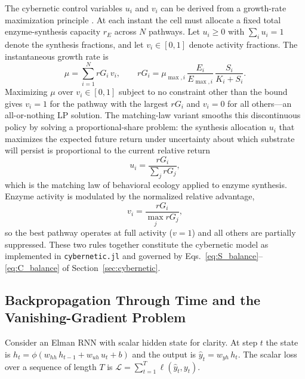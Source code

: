 The cybernetic control variables $u_i$ and $v_i$ can be derived from a
growth-rate maximization principle \cite{Kompala1984}.  At each instant the
cell must allocate a fixed total enzyme-synthesis capacity $r_E$ across $N$
pathways.  Let $u_i \geq 0$ with $\sum_i u_i = 1$ denote the synthesis
fractions, and let $v_i \in [0,1]$ denote activity fractions.  The
instantaneous growth rate is
\begin{equation}\label{eq:obj_cyber}
  \mu = \sum_{i=1}^{N} rG_i\,v_i,
  \qquad rG_i = \mu_{\max,i}\,\frac{E_i}{E_{\max,i}}\,\frac{S_i}{K_i + S_i}.
\end{equation}
Maximizing $\mu$ over $v_i \in [0,1]$ subject to no constraint other than
the bound gives $v_i = 1$ for the pathway with the largest $rG_i$ and
$v_i = 0$ for all others---an all-or-nothing LP solution.  The matching-law
variant smooths this discontinuous policy by solving a proportional-share
problem: the synthesis allocation $u_i$ that maximizes the expected future
return under uncertainty about which substrate will persist is
proportional to the current relative return
\begin{equation}
  u_i = \frac{rG_i}{\sum_j rG_j},
\end{equation}
which is the matching law of behavioral ecology applied to enzyme synthesis.
Enzyme activity is modulated by the normalized relative advantage,
\begin{equation}
  v_i = \frac{rG_i}{\max_j rG_j},
\end{equation}
so the best pathway operates at full activity ($v = 1$) and all others are
partially suppressed.  These two rules together constitute the cybernetic
model as implemented in \texttt{cybernetic.jl} and governed by
Eqs.~\eqref{eq:S_balance}--\eqref{eq:C_balance} of Section~\ref{sec:cybernetic}.

\subsection{Backpropagation Through Time and the Vanishing-Gradient Problem}
\label{sec:bptt_derivation}

Consider an Elman RNN with scalar hidden state for clarity.  At step $t$ the
state is $h_t = \phi(w_{hh}\,h_{t-1} + w_{uh}\,u_t + b)$ and the output is
$\hat{y}_t = w_{yh}\,h_t$.  The scalar loss over a sequence of length $T$ is
$\mathcal{L} = \sum_{t=1}^{T}\ell(\hat{y}_t, y_t)$.

